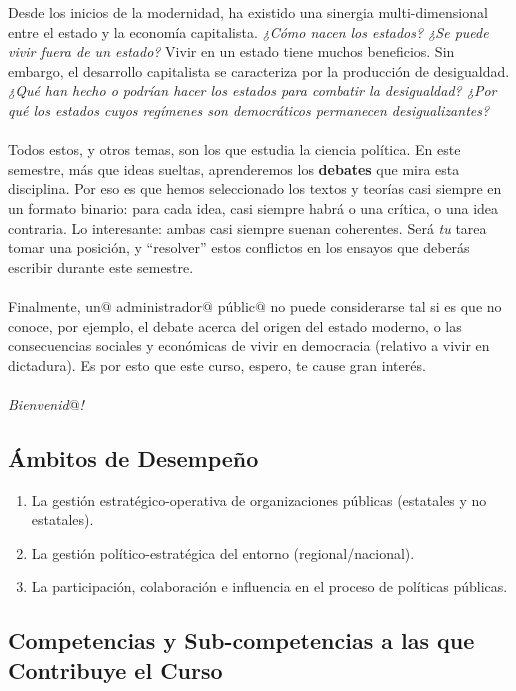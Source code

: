 \documentclass[letterpaper]{article}
\begin{document}
Desde los inicios de la modernidad, ha existido una sinergia multi-dimensional entre el estado y la econom\'ia capitalista. \emph{¿C\'omo nacen los estados? ¿Se puede vivir fuera de un estado?} Vivir en un estado tiene muchos beneficios. Sin embargo, el desarrollo capitalista se caracteriza por la producci\'on de desigualdad. \emph{¿Qu\'e han hecho o podr\'ian hacer los estados para combatir la desigualdad? ¿Por qu\'e los estados cuyos reg\'imenes son democr\'aticos permanecen desigualizantes?}  
\\
\\
Todos estos, y otros temas, son los que estudia la ciencia pol\'itica. En este semestre, m\'as que ideas sueltas, aprenderemos los {\bf debates} que mira esta disciplina. Por eso es que hemos seleccionado los textos y teor\'ias casi siempre en un formato binario: para cada idea, casi siempre habr\'a o una cr\'itica, o una idea contraria. Lo interesante: ambas casi siempre suenan coherentes. Ser\'a \emph{tu} tarea tomar una posici\'on, y ``resolver'' estos conflictos en los ensayos que deber\'as escribir durante este semestre. 
\\
\\
Finalmente, un$@$ administrador$@$ p\'ublic$@$ no puede considerarse tal si es que no conoce, por ejemplo, el debate acerca del origen del estado moderno, o las consecuencias sociales y econ\'omicas de vivir en democracia (relativo a vivir en dictadura). Es por esto que este curso, espero, te cause gran inter\'es.
\\
\\
\emph{Bienvenid$@$!}


\subsection*{\'Ambitos de Desempe\~no}

\begin{enumerate}
  \item La gesti\'on estrat\'egico-operativa de organizaciones p\'ublicas (estatales y no estatales).
  \item La gesti\'on pol\'itico-estrat\'egica del entorno (regional/nacional).
  \item La participaci\'on, colaboraci\'on e influencia en el proceso de pol\'iticas p\'ublicas.
\end{enumerate}


\subsection*{Competencias y Sub-competencias a las que Contribuye el Curso}
\end{document}
